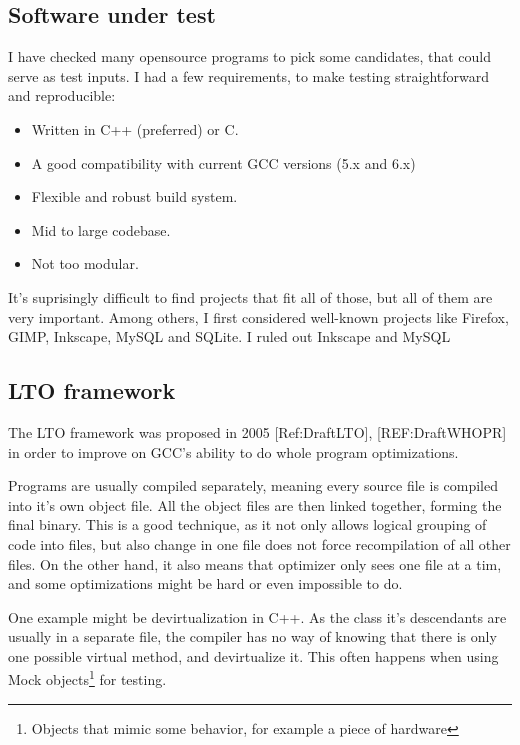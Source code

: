 \subsection{Software under test}

I have checked many opensource programs to pick some candidates, that could
serve as test inputs. I had a few requirements, to make testing straightforward
and reproducible:

\begin{itemize}
	\item Written in C++ (preferred) or C.
	\item A good compatibility with current GCC versions (5.x and 6.x)
	\item Flexible and robust build system.
	\item Mid to large codebase.
	\item Not too modular.
\end{itemize}

It's suprisingly difficult to find projects that fit all of those, but all of
them are very important. Among others, I first considered well-known projects
like Firefox, GIMP, Inkscape, MySQL and SQLite. I ruled out Inkscape and MySQL


\subsection{LTO framework}

The LTO framework was proposed in 2005 [Ref:DraftLTO], [REF:DraftWHOPR] in
order to improve on GCC's ability to do whole program optimizations.

Programs are usually compiled separately, meaning every source file is compiled
into it's own object file. All the object files are then linked together,
forming the final binary. This is a good technique, as it not only allows
logical grouping of code into files, but also change in one file does not force
recompilation of all other files. On the other hand, it also means that
optimizer only sees one file at a tim, and some optimizations might be hard or
even impossible to do.

One example might be devirtualization in C++. As the class it's descendants are
usually in a separate file, the compiler has no way of knowing that there is
only one possible virtual method, and devirtualize it. This often happens when
using Mock objects\footnote{Objects that mimic some behavior, for example a
piece of hardware} for testing.

